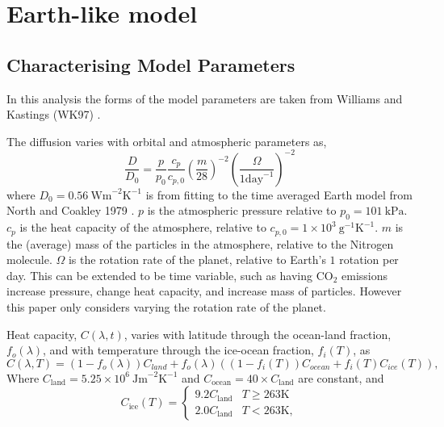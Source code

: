 \documentclass[12pt, onecolumn]{revtex4-2}    %
\newcommand{\heatcap}{\ensuremath{\ \text{Jm}^{-2} \text{K}^{-1}}}
\newcommand{\diffusion}{\ensuremath{\ \text{Wm}^{-2} \text{K}^{-1}}}
\begin{document}
\section{Earth-like model} \label{sec:EarthLikeModel}
\subsection{Characterising Model Parameters} \label{ssec:CharacterisingModelParameters} %
In this analysis the forms of the model parameters are taken from Williams and Kastings (WK97) \cite{WK97}.

The diffusion varies with orbital and atmospheric parameters as,
\begin{equation}
  \frac{D}{D_0} = \frac{p}{p_0} \frac{c_p}{c_{p,0}} \left(\frac{m}{28}\right)^{-2} \left(\frac{\Omega}{1 \text{day}^{-1}}\right)^{-2}
\end{equation}
where $D_0 = 0.56 \diffusion$ is from fitting to the time averaged Earth model from North and Coakley 1979 \cite{NC79}.
$p$ is the atmospheric pressure relative to $p_0 = 101 \ \text{kPa}$.
$c_p$ is the heat capacity of the atmosphere, relative to $c_{p,0} = 1\times10^3 \ \text{g}^{-1} \text{K}^{-1}$.
$m$ is the (average) mass of the particles in the atmosphere, relative to the Nitrogen molecule.
$\Omega$ is the rotation rate of the planet, relative to Earth's $1$ rotation per day.
This can be extended to be time variable, such as having CO$_2$ emissions increase pressure, change heat capacity, and increase mass of particles.
However this paper only considers varying the rotation rate of the planet.

Heat capacity, $C(\lambda, t)$, varies with latitude through the ocean-land fraction, $f_o(\lambda)$, and with temperature through the ice-ocean fraction, $f_i(T)$, as
\begin{equation}
  C(\lambda, T) = (1 - f_o(\lambda)) C_{land} + f_o(\lambda) ((1-f_i(T)) C_{ocean} + f_i(T) C_{ice}(T)),
\end{equation}
Where $C_{\text{land}} = 5.25\times10^6 \heatcap$ and $C_{\text{ocean}} = 40 \times C_{\text{land}}$ are constant, and
\begin{equation}
  C_{\text{ice}}(T) =
  \begin{cases}
    9.2 C_\text{land} & T \ge 263\text{K} \\
    2.0 C_\text{land} & T < 263\text{K},
  \end{cases}
\end{equation}
\end{document}
